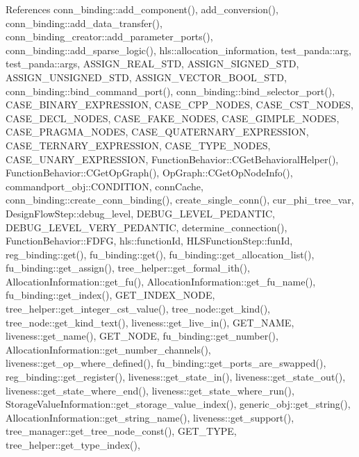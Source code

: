 References conn\+\_\+binding\+::add\+\_\+component(), add\+\_\+conversion(), conn\+\_\+binding\+::add\+\_\+data\+\_\+transfer(), conn\+\_\+binding\+\_\+creator\+::add\+\_\+parameter\+\_\+ports(), conn\+\_\+binding\+::add\+\_\+sparse\+\_\+logic(), hls\+::allocation\+\_\+information, test\+\_\+panda\+::arg, test\+\_\+panda\+::args, A\+S\+S\+I\+G\+N\+\_\+\+R\+E\+A\+L\+\_\+\+S\+TD, A\+S\+S\+I\+G\+N\+\_\+\+S\+I\+G\+N\+E\+D\+\_\+\+S\+TD, A\+S\+S\+I\+G\+N\+\_\+\+U\+N\+S\+I\+G\+N\+E\+D\+\_\+\+S\+TD, A\+S\+S\+I\+G\+N\+\_\+\+V\+E\+C\+T\+O\+R\+\_\+\+B\+O\+O\+L\+\_\+\+S\+TD, conn\+\_\+binding\+::bind\+\_\+command\+\_\+port(), conn\+\_\+binding\+::bind\+\_\+selector\+\_\+port(), C\+A\+S\+E\+\_\+\+B\+I\+N\+A\+R\+Y\+\_\+\+E\+X\+P\+R\+E\+S\+S\+I\+ON, C\+A\+S\+E\+\_\+\+C\+P\+P\+\_\+\+N\+O\+D\+ES, C\+A\+S\+E\+\_\+\+C\+S\+T\+\_\+\+N\+O\+D\+ES, C\+A\+S\+E\+\_\+\+D\+E\+C\+L\+\_\+\+N\+O\+D\+ES, C\+A\+S\+E\+\_\+\+F\+A\+K\+E\+\_\+\+N\+O\+D\+ES, C\+A\+S\+E\+\_\+\+G\+I\+M\+P\+L\+E\+\_\+\+N\+O\+D\+ES, C\+A\+S\+E\+\_\+\+P\+R\+A\+G\+M\+A\+\_\+\+N\+O\+D\+ES, C\+A\+S\+E\+\_\+\+Q\+U\+A\+T\+E\+R\+N\+A\+R\+Y\+\_\+\+E\+X\+P\+R\+E\+S\+S\+I\+ON, C\+A\+S\+E\+\_\+\+T\+E\+R\+N\+A\+R\+Y\+\_\+\+E\+X\+P\+R\+E\+S\+S\+I\+ON, C\+A\+S\+E\+\_\+\+T\+Y\+P\+E\+\_\+\+N\+O\+D\+ES, C\+A\+S\+E\+\_\+\+U\+N\+A\+R\+Y\+\_\+\+E\+X\+P\+R\+E\+S\+S\+I\+ON, Function\+Behavior\+::\+C\+Get\+Behavioral\+Helper(), Function\+Behavior\+::\+C\+Get\+Op\+Graph(), Op\+Graph\+::\+C\+Get\+Op\+Node\+Info(), commandport\+\_\+obj\+::\+C\+O\+N\+D\+I\+T\+I\+ON, conn\+Cache, conn\+\_\+binding\+::create\+\_\+conn\+\_\+binding(), create\+\_\+single\+\_\+conn(), cur\+\_\+phi\+\_\+tree\+\_\+var, Design\+Flow\+Step\+::debug\+\_\+level, D\+E\+B\+U\+G\+\_\+\+L\+E\+V\+E\+L\+\_\+\+P\+E\+D\+A\+N\+T\+IC, D\+E\+B\+U\+G\+\_\+\+L\+E\+V\+E\+L\+\_\+\+V\+E\+R\+Y\+\_\+\+P\+E\+D\+A\+N\+T\+IC, determine\+\_\+connection(), Function\+Behavior\+::\+F\+D\+FG, hls\+::function\+Id, H\+L\+S\+Function\+Step\+::fun\+Id, reg\+\_\+binding\+::get(), fu\+\_\+binding\+::get(), fu\+\_\+binding\+::get\+\_\+allocation\+\_\+list(), fu\+\_\+binding\+::get\+\_\+assign(), tree\+\_\+helper\+::get\+\_\+formal\+\_\+ith(), Allocation\+Information\+::get\+\_\+fu(), Allocation\+Information\+::get\+\_\+fu\+\_\+name(), fu\+\_\+binding\+::get\+\_\+index(), G\+E\+T\+\_\+\+I\+N\+D\+E\+X\+\_\+\+N\+O\+DE, tree\+\_\+helper\+::get\+\_\+integer\+\_\+cst\+\_\+value(), tree\+\_\+node\+::get\+\_\+kind(), tree\+\_\+node\+::get\+\_\+kind\+\_\+text(), liveness\+::get\+\_\+live\+\_\+in(), G\+E\+T\+\_\+\+N\+A\+ME, liveness\+::get\+\_\+name(), G\+E\+T\+\_\+\+N\+O\+DE, fu\+\_\+binding\+::get\+\_\+number(), Allocation\+Information\+::get\+\_\+number\+\_\+channels(), liveness\+::get\+\_\+op\+\_\+where\+\_\+defined(), fu\+\_\+binding\+::get\+\_\+ports\+\_\+are\+\_\+swapped(), reg\+\_\+binding\+::get\+\_\+register(), liveness\+::get\+\_\+state\+\_\+in(), liveness\+::get\+\_\+state\+\_\+out(), liveness\+::get\+\_\+state\+\_\+where\+\_\+end(), liveness\+::get\+\_\+state\+\_\+where\+\_\+run(), Storage\+Value\+Information\+::get\+\_\+storage\+\_\+value\+\_\+index(), generic\+\_\+obj\+::get\+\_\+string(), Allocation\+Information\+::get\+\_\+string\+\_\+name(), liveness\+::get\+\_\+support(), tree\+\_\+manager\+::get\+\_\+tree\+\_\+node\+\_\+const(), G\+E\+T\+\_\+\+T\+Y\+PE, tree\+\_\+helper\+::get\+\_\+type\+\_\+index(), 